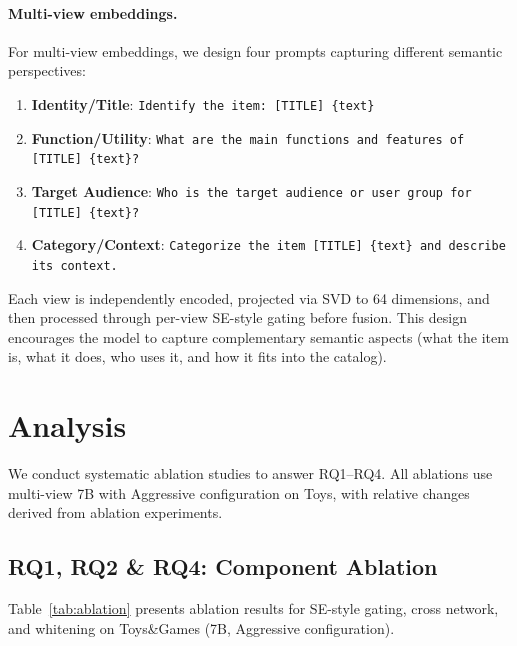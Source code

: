 \documentclass[sigconf,natbib=true]{acmart}
\begin{document}
\paragraph{Multi-view embeddings.}
For multi-view embeddings, we design four prompts capturing
different semantic perspectives:
\begin{enumerate}[leftmargin=*,itemsep=1pt]
  \item \textbf{Identity/Title}:
    \texttt{Identify the item: [TITLE] \{text\}}
  \item \textbf{Function/Utility}:
    \texttt{What are the main functions and features of
    [TITLE] \{text\}?}
  \item \textbf{Target Audience}:
    \texttt{Who is the target audience or user group for
    [TITLE] \{text\}?}
  \item \textbf{Category/Context}:
    \texttt{Categorize the item [TITLE] \{text\} and describe
    its context.}
\end{enumerate}
Each view is independently encoded, projected via SVD to 64
dimensions, and then processed through per-view SE-style gating
before fusion.
This design encourages the model to capture complementary
semantic aspects (what the item is, what it does, who uses
it, and how it fits into the catalog).

\section{Analysis}

We conduct systematic ablation studies to answer RQ1--RQ4.
All ablations use multi-view 7B with Aggressive configuration
on Toys, with relative changes derived from ablation
experiments.

\subsection{RQ1, RQ2 \& RQ4: Component Ablation}

Table~\ref{tab:ablation} presents ablation results for SE-style gating,
cross network, and whitening on Toys\&Games (7B, Aggressive configuration).
\end{document}
